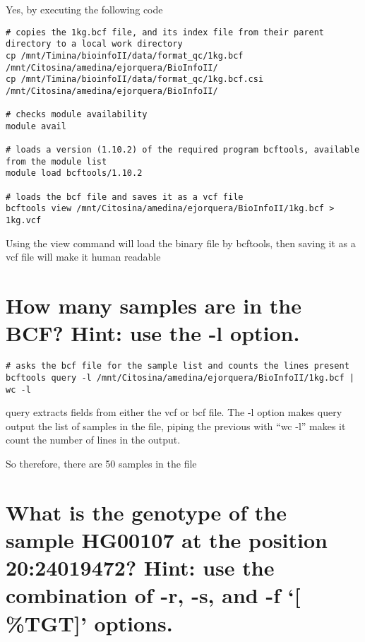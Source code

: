 \documentclass[
]{article}
\begin{document}
Yes, by executing the following code

\begin{verbatim}
# copies the 1kg.bcf file, and its index file from their parent directory to a local work directory
cp /mnt/Timina/bioinfoII/data/format_qc/1kg.bcf /mnt/Citosina/amedina/ejorquera/BioInfoII/
cp /mnt/Timina/bioinfoII/data/format_qc/1kg.bcf.csi /mnt/Citosina/amedina/ejorquera/BioInfoII/

# checks module availability 
module avail

# loads a version (1.10.2) of the required program bcftools, available from the module list
module load bcftools/1.10.2

# loads the bcf file and saves it as a vcf file
bcftools view /mnt/Citosina/amedina/ejorquera/BioInfoII/1kg.bcf > 1kg.vcf
\end{verbatim}

Using the view command will load the binary file by bcftools, then
saving it as a vcf file will make it human readable

\hypertarget{how-many-samples-are-in-the-bcf-hint-use-the--l-option.}{%
\section{How many samples are in the BCF? Hint: use the -l
option.}\label{how-many-samples-are-in-the-bcf-hint-use-the--l-option.}}

\begin{verbatim}
# asks the bcf file for the sample list and counts the lines present
bcftools query -l /mnt/Citosina/amedina/ejorquera/BioInfoII/1kg.bcf | wc -l
\end{verbatim}

query extracts fields from either the vcf or bcf file. The -l option
makes query output the list of samples in the file, piping the previous
with ``wc -l'' makes it count the number of lines in the output.

So therefore, there are 50 samples in the file

\hypertarget{what-is-the-genotype-of-the-sample-hg00107-at-the-position-2024019472-hint-use-the-combination-of--r--s-and--f-tgt-options.}{%
\section{\texorpdfstring{What is the genotype of the sample HG00107 at
the position 20:24019472? Hint: use the combination of -r, -s, and -f
`{[} \%TGT{]}\n'
options.}{What is the genotype of the sample HG00107 at the position 20:24019472? Hint: use the combination of -r, -s, and -f `{[} \%TGT{]}' options.}}\label{what-is-the-genotype-of-the-sample-hg00107-at-the-position-2024019472-hint-use-the-combination-of--r--s-and--f-tgt-options.}}
\end{document}

